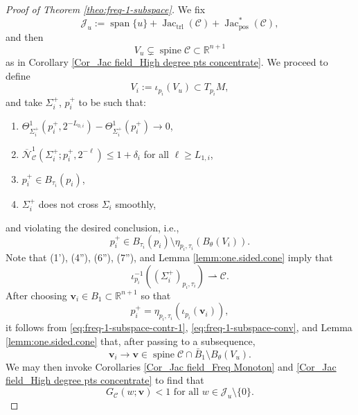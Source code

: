 \documentclass[11pt, letterpaper, reqno]{amsart}
\numberwithin{equation}{section}
\theoremstyle{remark}
\newcommand{\RR}{\mathbb{R}}
\newcommand{\cC}{\mathcal{C}}
\newcommand{\cJ}{\mathcal{J}}
\newcommand{\cN}{\mathcal{N}}
\newcommand{\mbfv}{\mathbf{v}}
\newcommand{\Jac}{\operatorname{Jac}}
\newcommand{\spine}{\operatorname{spine}}
\newcommand{\Span}{\operatorname{span}}
\begin{document}
\begin{proof}[Proof of Theorem \ref{theo:freq-1-subspace}]
We fix
\[ \cJ_u := \Span\{u \} + \Jac_\textrm{trl}(\cC) + \Jac^*_\textrm{pos}(\cC), \]
and then
\[ V_u \subsetneq \spine \cC \subset \RR^{n+1} \]
as in Corollary \ref{Cor_Jac field_High degree pts concentrate}. We proceed to define
\[ V_i := \iota_{p_i}(V_u) \subset T_{p_i} M, \]
and take $\Sigma_i^+$, $p_i^+$ to be such that:
\begin{enumerate}
	\item[(4'')] $\Theta^{1}_{\Sigma_i^+}(p_i^+, 2^{-L_{0,i}}) - \Theta^{1}_{\Sigma_i^+}(p_i^+) \to 0$, 
	\item[(5'')] $\overline{\cN}^{1}_\cC(\Sigma_i^+; p_i^+, 2^{-\ell}) \leq 1 + \delta_i$ for all $\ell \geq L_{1,i}$,
	\item[(6'')] $p_i^+ \in B_{\tau_i}(p_i)$,
	\item[(7'')] $\Sigma^+_i$ does not cross $\Sigma_i$ smoothly,
\end{enumerate}
and violating the desired conclusion, i.e.,
\begin{equation} \label{eq:freq-1-subspace-contr-1}
	p_i^+ \in B_{\tau_i}(p_i) \setminus \eta_{p_i,\tau_i}(B_\theta(V_i)).
\end{equation}
Note that (1'), (4''), (6''), (7''), and Lemma \ref{lemm:one.sided.cone} imply that
\begin{equation} \label{eq:freq-1-subspace-conv}
	\iota_{p_i}^{-1}((\Sigma_i^+)_{p_i,\tau_i}) \rightharpoonup \cC.
\end{equation}
After choosing $\mbfv_i \in B_1 \subset \RR^{n+1}$ so that
\[ p_i^+ = \eta_{p_i,\tau_i}(\iota_{p_i}(\mbfv_i)), \]
it follows from \eqref{eq:freq-1-subspace-contr-1}, \eqref{eq:freq-1-subspace-conv}, and Lemma \ref{lemm:one.sided.cone} that, after passing to a subsequence,
\begin{equation} \label{eq:freq-1-subspace-limit-spine}
	\mbfv_i \to \mbfv \in \spine \cC \cap \bar B_1 \setminus B_\theta(V_u).
\end{equation}
We may then invoke Corollaries \ref{Cor_Jac field_Freq Monoton} and \ref{Cor_Jac field_High degree pts concentrate} to find that
\begin{equation} \label{eq:freq-splitting-contr-at-Q}
	G_\cC(w; \mbfv) < 1 \text{ for all } w \in \cJ_u \setminus \{ 0 \}.
\end{equation}


\end{proof}
\end{document}

